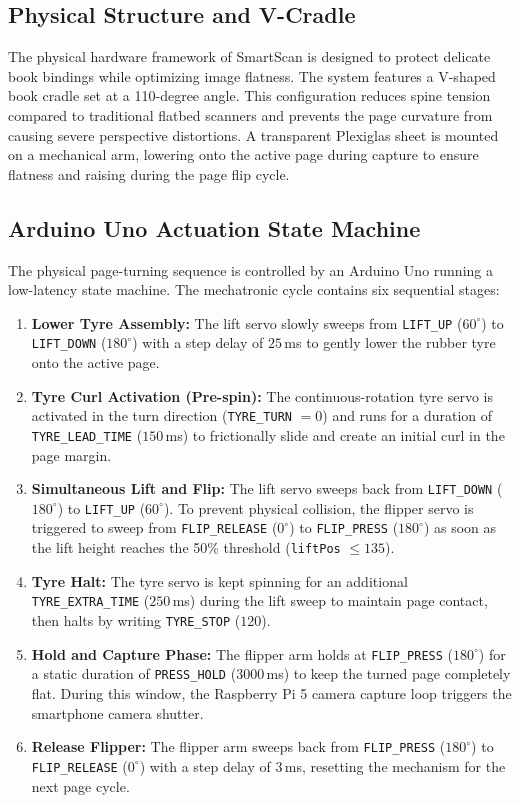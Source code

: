 \documentclass[conference]{IEEEtran}
\begin{document}
\subsection{Physical Structure and V-Cradle}
The physical hardware framework of SmartScan is designed to protect delicate book bindings while optimizing image flatness. The system features a V-shaped book cradle set at a 110-degree angle. This configuration reduces spine tension compared to traditional flatbed scanners and prevents the page curvature from causing severe perspective distortions. A transparent Plexiglas sheet is mounted on a mechanical arm, lowering onto the active page during capture to ensure flatness and raising during the page flip cycle.

\subsection{Arduino Uno Actuation State Machine}
The physical page-turning sequence is controlled by an Arduino Uno running a low-latency state machine. The mechatronic cycle contains six sequential stages:
\begin{enumerate}
\item \textbf{Lower Tyre Assembly:} The lift servo slowly sweeps from \texttt{LIFT\_UP} ($60^\circ$) to \texttt{LIFT\_DOWN} ($180^\circ$) with a step delay of $25$\,ms to gently lower the rubber tyre onto the active page.
\item \textbf{Tyre Curl Activation (Pre-spin):} The continuous-rotation tyre servo is activated in the turn direction (\texttt{TYRE\_TURN} $= 0$) and runs for a duration of \texttt{TYRE\_LEAD\_TIME} ($150$\,ms) to frictionally slide and create an initial curl in the page margin.
\item \textbf{Simultaneous Lift and Flip:} The lift servo sweeps back from \texttt{LIFT\_DOWN} ($180^\circ$) to \texttt{LIFT\_UP} ($60^\circ$). To prevent physical collision, the flipper servo is triggered to sweep from \texttt{FLIP\_RELEASE} ($0^\circ$) to \texttt{FLIP\_PRESS} ($180^\circ$) as soon as the lift height reaches the 50\% threshold (\texttt{liftPos} $\le 135$).
\item \textbf{Tyre Halt:} The tyre servo is kept spinning for an additional \texttt{TYRE\_EXTRA\_TIME} ($250$\,ms) during the lift sweep to maintain page contact, then halts by writing \texttt{TYRE\_STOP} ($120$).
\item \textbf{Hold and Capture Phase:} The flipper arm holds at \texttt{FLIP\_PRESS} ($180^\circ$) for a static duration of \texttt{PRESS\_HOLD} ($3000$\,ms) to keep the turned page completely flat. During this window, the Raspberry Pi 5 camera capture loop triggers the smartphone camera shutter.
\item \textbf{Release Flipper:} The flipper arm sweeps back from \texttt{FLIP\_PRESS} ($180^\circ$) to \texttt{FLIP\_RELEASE} ($0^\circ$) with a step delay of $3$\,ms, resetting the mechanism for the next page cycle.
\end{enumerate}
\end{document}

